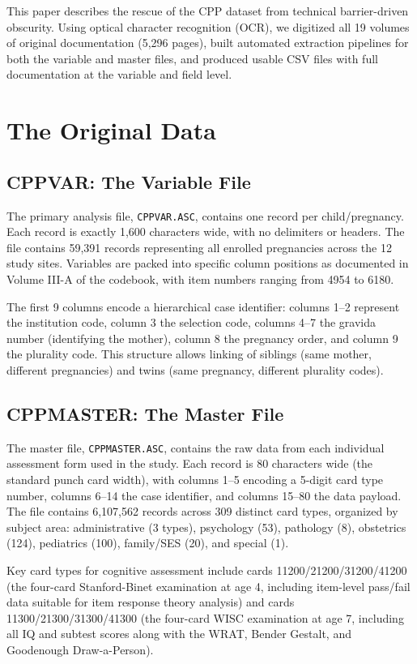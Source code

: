 \documentclass[12pt]{article}
\begin{document}
This paper describes the rescue of the CPP dataset from technical barrier-driven obscurity. Using optical character recognition (OCR), we digitized all 19 volumes of original documentation (5,296 pages), built automated extraction pipelines for both the variable and master files, and produced usable CSV files with full documentation at the variable and field level.

\section{The Original Data}

\subsection{CPPVAR: The Variable File}

The primary analysis file, \texttt{CPPVAR.ASC}, contains one record per child/pregnancy. Each record is exactly 1,600 characters wide, with no delimiters or headers. The file contains 59,391 records representing all enrolled pregnancies across the 12 study sites. Variables are packed into specific column positions as documented in Volume III-A of the codebook, with item numbers ranging from 4954 to 6180.

The first 9 columns encode a hierarchical case identifier: columns 1--2 represent the institution code, column 3 the selection code, columns 4--7 the gravida number (identifying the mother), column 8 the pregnancy order, and column 9 the plurality code. This structure allows linking of siblings (same mother, different pregnancies) and twins (same pregnancy, different plurality codes).

\subsection{CPPMASTER: The Master File}

The master file, \texttt{CPPMASTER.ASC}, contains the raw data from each individual assessment form used in the study. Each record is 80 characters wide (the standard punch card width), with columns 1--5 encoding a 5-digit card type number, columns 6--14 the case identifier, and columns 15--80 the data payload. The file contains 6,107,562 records across 309 distinct card types, organized by subject area: administrative (3 types), psychology (53), pathology (8), obstetrics (124), pediatrics (100), family/SES (20), and special (1).

Key card types for cognitive assessment include cards 11200/21200/31200/41200 (the four-card Stanford-Binet examination at age 4, including item-level pass/fail data suitable for item response theory analysis) and cards 11300/21300/31300/41300 (the four-card WISC examination at age 7, including all IQ and subtest scores along with the WRAT, Bender Gestalt, and Goodenough Draw-a-Person).
\end{document}
